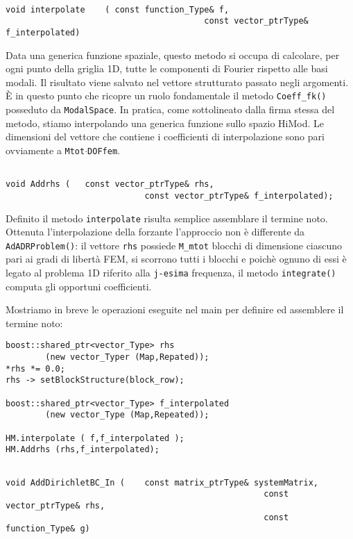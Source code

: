 \begin{lstlisting}[style = general, frame = top]

void interpolate	( const function_Type& f,
										const vector_ptrType& f_interpolated)
\end{lstlisting}
Data una generica funzione spaziale, questo metodo si occupa di calcolare, per ogni punto della griglia 1D, tutte le componenti di Fourier rispetto alle basi modali. Il risultato viene salvato nel vettore strutturato passato negli argomenti. \`E in questo punto che ricopre un ruolo fondamentale il metodo \texttt{Coeff\_fk()} posseduto da \texttt{ModalSpace}.
In pratica, come sottolineato dalla firma stessa del metodo, stiamo interpolando una generica funzione sullo spazio HiMod. Le dimensioni del vettore che contiene i coefficienti di interpolazione sono pari ovviamente a \texttt{Mtot$\cdot$DOFfem}.

\begin{lstlisting}[style=general, frame = top]

void Addrhs	(	const vector_ptrType& rhs,
							const vector_ptrType& f_interpolated);
\end{lstlisting}
Definito il metodo \texttt{interpolate} risulta semplice assemblare il termine noto. Ottenuta l'interpolazione della forzante l'approccio non \`e differente da \texttt{AdADRProblem()}: il vettore \texttt{rhs} possiede \texttt{M\_mtot} blocchi di dimensione ciascuno pari ai gradi di libert\`a FEM, si scorrono tutti i blocchi e poich\`e ognuno di essi \`e legato al problema 1D riferito alla \texttt{j-esima} frequenza, il metodo \texttt{integrate()} computa gli opportuni coefficienti.

Mostriamo in breve le operazioni eseguite nel main per definire ed assemblere il termine noto:
\begin{lstlisting}[style = general]
boost::shared_ptr<vector_Type> rhs 
		(new vector_Typer (Map,Repated));
*rhs *= 0.0;
rhs -> setBlockStructure(block_row);

boost::shared_ptr<vector_Type> f_interpolated 
		(new vector_Type (Map,Repeated));

HM.interpolate ( f,f_interpolated );
HM.Addrhs (rhs,f_interpolated);
\end{lstlisting}

\begin{lstlisting}[style = general,frame = top]

void AddDirichletBC_In (	const matrix_ptrType& systemMatrix,
													const vector_ptrType& rhs,
													const function_Type& g)
\end{lstlisting}

